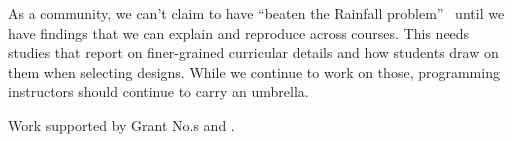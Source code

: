 As a community, we can't claim to have ``beaten the Rainfall
problem''~\cite{guzdial-rainfall-blog-aug10} until we have findings
that we can explain and reproduce across courses.  This needs studies that report on
finer-grained curricular details and how students draw on them when
selecting designs. While we continue to work on those, programming
instructors should continue to carry an umbrella.



\begin{acks}
Work supported by  Grant No.s  and .
\end{acks}

